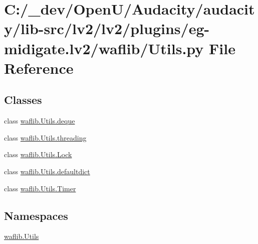 \hypertarget{lv2_2plugins_2eg-midigate_8lv2_2waflib_2_utils_8py}{}\section{C\+:/\+\_\+dev/\+Open\+U/\+Audacity/audacity/lib-\/src/lv2/lv2/plugins/eg-\/midigate.lv2/waflib/\+Utils.py File Reference}
\label{lv2_2plugins_2eg-midigate_8lv2_2waflib_2_utils_8py}
\subsection*{Classes}
\begin{DoxyCompactItemize}
\item 
class \hyperlink{classwaflib_1_1_utils_1_1deque}{waflib.\+Utils.\+deque}
\item 
class \hyperlink{classwaflib_1_1_utils_1_1threading}{waflib.\+Utils.\+threading}
\item 
class \hyperlink{classwaflib_1_1_utils_1_1_lock}{waflib.\+Utils.\+Lock}
\item 
class \hyperlink{classwaflib_1_1_utils_1_1defaultdict}{waflib.\+Utils.\+defaultdict}
\item 
class \hyperlink{classwaflib_1_1_utils_1_1_timer}{waflib.\+Utils.\+Timer}
\end{DoxyCompactItemize}
\subsection*{Namespaces}
\begin{DoxyCompactItemize}
\item 
 \hyperlink{namespacewaflib_1_1_utils}{waflib.\+Utils}
\end{DoxyCompactItemize}
